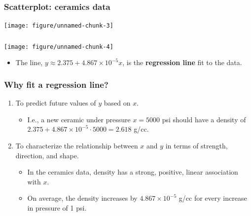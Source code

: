 \documentclass[handout]{beamer}\usepackage{graphicx, color}
\newenvironment{knitrout}{}{} %
\numberwithin{equation}{section}
\begin{document}
\begin{frame}[fragile]
\frametitle{\small Scatterplot: ceramics data}

\begin{center}
\begin{knitrout}
\color{fgcolor}
\texttt{[image: figure/unnamed-chunk-3]} 

\end{knitrout}

\end{center}
\end{frame}


\begin{frame}[fragile]
\frametitle{}
\begin{center}
\begin{knitrout}
\color{fgcolor}
\texttt{[image: figure/unnamed-chunk-4]} 

\end{knitrout}

\end{center}

\begin{itemize}
\item The line,  $y \approx 2.375 + 4.867 \times 10^{-5} x$, is the {\bf regression line} fit to the data.
\end{itemize}
\end{frame}

\begin{frame}
\frametitle{Why fit a regression line?}
\begin{enumerate}[1. ]
\pause \item To predict future values of $y$ based on $x$.
\begin{itemize}
\pause \item I.e., a new ceramic under pressure $x = 5000$ psi should have a density of $2.375 + 4.867 \times 10^{-5} \cdot 5000 = 2.618$ g/cc. 
\end{itemize}
\pause \item To characterize the relationship between $x$ and $y$ in terms of strength, direction, and shape.
\begin{itemize}
\pause \item In the ceramics data, density has a strong, positive, linear association with $x$. 
\pause \item On average, the density increases by $4.867 \times 10^{-5}$ g/cc for every increase in pressure of 1 psi.
\end{itemize}
\end{enumerate}
\end{frame}
\end{document}
